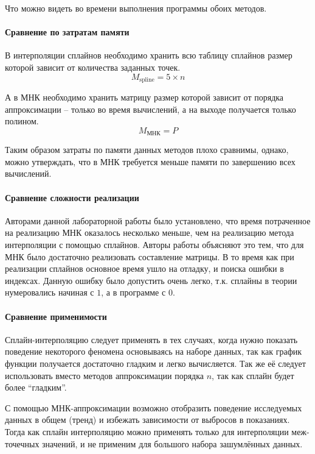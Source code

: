 \documentclass[a4paper]{article}
\begin{document}
Что можно видеть во времени выполнения программы обоих методов.

\paragraph{Сравнение по затратам памяти}
В интерполяции сплайнов необходимо хранить всю таблицу сплайнов размер которой зависит от количества заданных точек.
\begin{equation}
    M_{\text{spline}} = 5 \times n
\end{equation}

А в МНК необходимо хранить матрицу размер которой зависит от порядка аппроксимации -- только во время вычислений, а на выходе получается только полином.
\begin{equation}
    M_{\text{МНК}} = P
\end{equation}

Таким образом затраты по памяти данных методов плохо сравнимы, однако, можно утверждать, что в МНК требуется меньше памяти по завершению всех вычислений.

\paragraph{Сравнение сложности реализации}
Авторами данной лабораторной работы было установлено, что время потраченное на реализацию МНК оказалось несколько меньше, чем на реализацию метода интерполяции с помощью сплайнов. Авторы работы объясняют это тем, что для МНК было достаточно реализовать составление матрицы. В то время как при реализации сплайнов основное время ушло на отладку, и поиска ошибки в индексах. Данную ошибку было допустить очень легко, т.к. сплайны в теории нумеровались начиная с $1$, а в программе с $0$.

\paragraph{Сравнение применимости}
Сплайн-интерполяцию следует применять в тех случаях, когда нужно показать поведение некоторого феномена основываясь на наборе данных, так как график функции получается достаточно гладким и легко вычисляется. Так же её следует использовать вместо методов аппроксимации порядка $n$, так как сплайн будет более ``гладким''.

С помощью МНК-аппроксимации возможно отобразить поведение исследуемых данных в общем (тренд) и избежать зависимости от выбросов в показаниях. Тогда как сплайн интерполяцию можно применять только для интерполяции меж-точечных значений, и не применим для большого набора зашумлённых данных.
\end{document}
